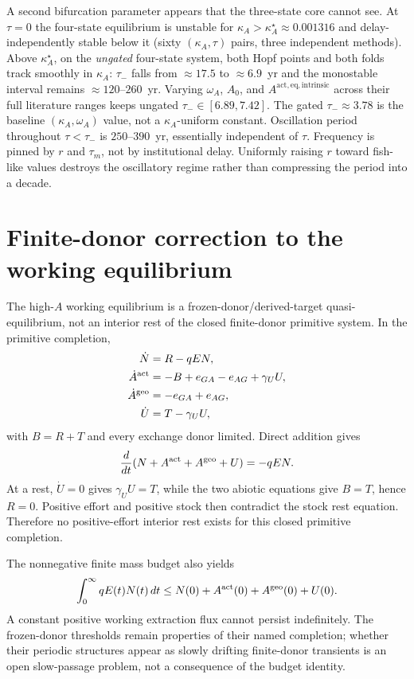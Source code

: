 \documentclass[11pt]{article}
\theoremstyle{definition}
\begin{document}
A second bifurcation parameter appears that the three-state core cannot see. At $\tau=0$ the four-state equilibrium is unstable for $\kappa_A>\kappa_A^\star\approx 0.001316$ and delay-independently stable below it (sixty $(\kappa_A,\tau)$ pairs, three independent methods). Above $\kappa_A^\star$, on the \emph{ungated} four-state system, both Hopf points and both folds track smoothly in $\kappa_A$: $\tau_-$ falls from $\approx 17.5$ to $\approx 6.9$~yr and the monostable interval remains $\approx 120$--$260$~yr. Varying $\omega_A$, $A_0$, and $A^{\mathrm{act,eq,intrinsic}}$ across their full literature ranges keeps ungated $\tau_-\in[6.89,7.42]$. The gated $\tau_-\approx 3.78$ is the baseline $(\kappa_A,\omega_A)$ value, not a $\kappa_A$-uniform constant. Oscillation period throughout $\tau<\tau_-$ is $250$--$390$~yr, essentially independent of $\tau$. Frequency is pinned by $r$ and $\tau_m$, not by institutional delay. Uniformly raising $r$ toward fish-like values destroys the oscillatory regime rather than compressing the period into a decade.

\section{Finite-donor correction to the working equilibrium}
\label{sec:finite-donor-bridge}

The high-$A$ working equilibrium is a frozen-donor/derived-target quasi-equilibrium, not an interior rest of the closed finite-donor primitive system. In the primitive completion,
\begin{align}
\dot N&=R-qEN,\\
\dot A^{\rm act}&=-B+e_{GA}-e_{AG}+\gamma_UU,\\
\dot A^{\rm geo}&=-e_{GA}+e_{AG},\\
\dot U&=T-\gamma_UU,
\end{align}
with $B=R+T$ and every exchange donor limited. Direct addition gives
\[
\frac d{dt}(N+A^{\rm act}+A^{\rm geo}+U)=-qEN.
\]
At a rest, $\dot U=0$ gives $\gamma_UU=T$, while the two abiotic equations give $B=T$, hence $R=0$. Positive effort and positive stock then contradict the stock rest equation. Therefore no positive-effort interior rest exists for this closed primitive completion.

The nonnegative finite mass budget also yields
\[
\int_0^\infty qE(t)N(t)\,dt
\le N(0)+A^{\rm act}(0)+A^{\rm geo}(0)+U(0).
\]
A constant positive working extraction flux cannot persist indefinitely. The frozen-donor thresholds remain properties of their named completion; whether their periodic structures appear as slowly drifting finite-donor transients is an open slow-passage problem, not a consequence of the budget identity.
\end{document}
